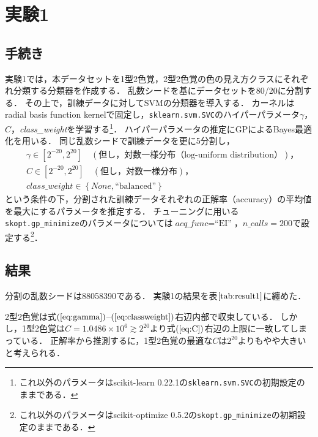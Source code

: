 \documentclass[uplatex,paper=a4,fontsize=4.0truemm,jafontsize=4.0truemm,head_space=30.0truemm,foot_space=30.0truemm,baselineskip=8.0truemm,line_length=40zw,gutter=25.0truemm,oneside,openany,fleqn,hanging_panctuation,open_bracket_pos=nibu_tentsuki,dvipdfmx,jis2004,book,titlepage]{jlreq}
\theoremstyle{mystyle}
\newcommand{\mathdisplaystyle}[1]{\(\displaystyle{#1}\)}
\newcommand{\Reference}[1]{\mathdisplaystyle{\ref{#1}}}
\newcommand{\Equationreference}[1]{\mathdisplaystyle{\parentheses{\ref{#1}}}}
\newcommand{\negativevalue}[1]{{-#1}}
\newcommand{\parentheses}[1]{\left(#1\right)}
\newcommand{\braces}[1]{\left\{#1\right\}}
\newcommand{\squarebrackets}[1]{\left[#1\right]}
\begin{document}
		\section{実験1}
			\subsection{手続き}
				実験1では，本データセットを1型2色覚，2型2色覚の色の見え方クラスにそれぞれ分類する分類器を作成する．
				乱数シードを基にデータセットを80/20に分割する．
				その上で，訓練データに対してSVMの分類器を導入する．
				カーネルはradial basis function kernelで固定し，\texttt{sklearn{.}svm{.}SVC}のハイパーパラメータ\mathdisplaystyle{\gamma}，\mathdisplaystyle{C}，\textit{class\_weight}を学習する\footnote{これ以外のパラメータはscikit-learn 0.22.1の\texttt{sklearn{.}svm{.}SVC}の初期設定のままである．}．
				ハイパーパラメータの推定にGPによるBayes最適化を用いる．
				同じ乱数シードで訓練データを更に5分割し，
				\begin{align}
					&\gamma\in\squarebrackets{2^\negativevalue{20},2^{20}}\quad\parentheses{\textrm{但し，対数一様分布（log-uniform distribution）}}\textrm{，}\label{eq:gamma}\\
					&C\in\squarebrackets{2^\negativevalue{20},2^{20}}\quad\parentheses{\textrm{但し，対数一様分布}}\textrm{，}\label{eq:C}\\
					&\textit{class\_weight}\in\braces{\textit{None},\textrm{``balanced''}}\label{eq:classweight}
				\end{align}
				という条件の下，分割された訓練データそれぞれの正解率（accuracy）の平均値を最大にするパラメータを推定する．
				チューニングに用いる\texttt{skopt{.}gp\_minimize}のパラメータについては\mathdisplaystyle{\textit{acq\_func}=\textrm{``EI''}}，\mathdisplaystyle{\textit{n\_calls}=200}で設定する\footnote{これ以外のパラメータはscikit-optimize 0.5.2の\texttt{\texttt{skopt{.}gp\_minimize}}の初期設定のままである．}．
			\subsection{結果}
				分割の乱数シードは88058390である．
				実験1の結果を表\Reference{tab:result1}に纏めた．

				2型2色覚は式\Equationreference{eq:gamma}--\Equationreference{eq:classweight}右辺内部で収束している．
				しかし，1型2色覚は\mathdisplaystyle{C=1.0486\times10^6\gtrsim2^{20}}より式\Equationreference{eq:C}右辺の上限に一致してしまっている．
				正解率から推測するに，1型2色覚の最適な\mathdisplaystyle{C}は\mathdisplaystyle{2^{20}}よりもやや大きいと考えられる．
\end{document}
